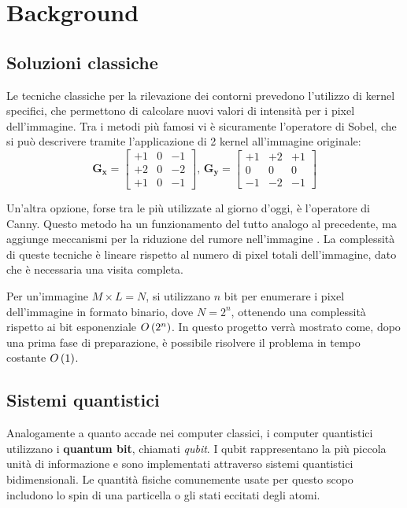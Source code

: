 \section{Background}\label{sec:background}

\subsection{Soluzioni classiche}
Le tecniche classiche per la rilevazione dei contorni prevedono l'utilizzo di 
kernel specifici, che permettono di calcolare nuovi valori di intensità per i pixel 
dell'immagine. Tra i metodi più famosi vi è sicuramente l'operatore di Sobel, 
che si può descrivere tramite l'applicazione di 2 kernel all'immagine originale:
\[
\mathbf{G_x} =
\begin{bmatrix}
+1 & 0 & -1 \\
+2 & 0 & -2 \\
+1 & 0 & -1
\end{bmatrix}
, \, 
\mathbf{G_y} =
\begin{bmatrix}
+1 & +2 & +1 \\
0 & 0 & 0 \\
-1 & -2 & -1
\end{bmatrix}
\]

Un'altra opzione, forse tra le più utilizzate al giorno d'oggi, è l'operatore di Canny.
Questo metodo ha un funzionamento del tutto analogo al precedente, ma aggiunge 
meccanismi per la riduzione del rumore nell'immagine \cite{digital_image_processing}.
La complessità di queste tecniche è lineare rispetto al numero di pixel totali 
dell'immagine, dato che è necessaria una visita completa. 

Per un'immagine $M \times L = N$, si utilizzano $n$ bit per enumerare i pixel dell'immagine
in formato binario, dove $N = 2^n$, ottenendo una complessità rispetto ai bit esponenziale $O\left({2^n}\right)$.
In questo progetto verrà mostrato come, dopo una prima fase di preparazione, è possibile risolvere
il problema in tempo costante $O\left({1}\right)$.

\subsection{Sistemi quantistici}

Analogamente a quanto accade nei computer classici, i computer quantistici utilizzano i \textbf{quantum bit}, chiamati \emph{qubit}. I qubit rappresentano la più piccola unità di informazione e sono implementati attraverso sistemi quantistici bidimensionali. Le quantità fisiche comunemente usate per questo scopo includono lo spin di una particella o gli stati eccitati degli atomi.

